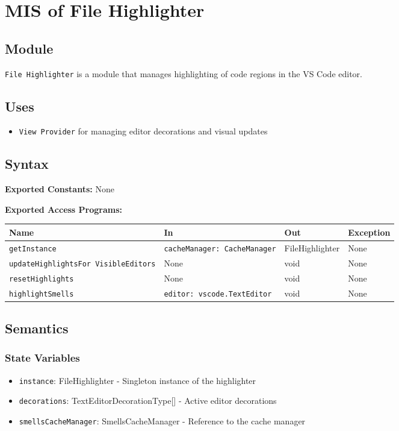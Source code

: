 \documentclass[12pt, titlepage]{article}
\begin{document}
\section{MIS of File Highlighter}

\subsection{Module}
\texttt{File Highlighter} is a module that manages highlighting of code regions in the VS Code editor.

\subsection{Uses}
\begin{itemize}
\item \texttt{View Provider} for managing editor decorations and visual updates
\end{itemize}

\subsection{Syntax}

\textbf{Exported Constants:} None

\noindent \textbf{Exported Access Programs:}\\
\begin{tabularx}{\linewidth}{|p{5cm}|>{\raggedright\arraybackslash}X|l|l|}
  \hline
  \textbf{Name} & \textbf{In} & \textbf{Out} & \textbf{Exception} \\
  \hline
  \texttt{getInstance} & \texttt{cacheManager: CacheManager} & FileHighlighter & None \\ \hline
  \texttt{updateHighlightsFor \allowbreak VisibleEditors} & None & void & None \\ \hline
  \texttt{resetHighlights} & None & void & None \\ \hline
  \texttt{highlightSmells} & \texttt{editor: vscode.TextEditor} & void & None \\
  \hline
\end{tabularx}

\subsection{Semantics}

\subsubsection{State Variables}
\begin{itemize}
\item \texttt{instance}: FileHighlighter - Singleton instance of the highlighter
\item \texttt{decorations}: TextEditorDecorationType[] - Active editor decorations
\item \texttt{smellsCacheManager}: SmellsCacheManager - Reference to the cache manager
\end{itemize}
\end{document}
